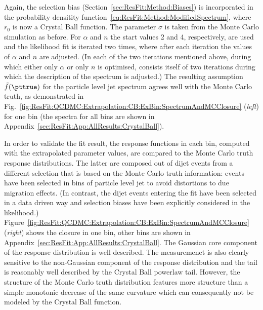 Again, the selection bias (Section~\ref{sec:ResFit:Method:Biases}) is incorporated in the probability densitity function~\eqref{eq:ResFit:Method:ModifiedSpectrum}, where $r_{0}$ is now a Crystal Ball function.
The parameter $\sigma$ is taken from the Monte Carlo simulation as before.
For $\alpha$ and $n$ the start values 2 and 4, respectively, are used and the likelihood fit is iterated two times, where after each iteration the values of $\alpha$ and $n$ are adjusted.
(In each of the two iterations mentioned above, during which either only $\alpha$ or only $n$ is optimised, consists itself of two iterations during which the description of the spectrum is adjusted.)
The resulting assumption~$\tilde{f}(\pttrue)$ for the particle level jet \pt spectrum agrees well with the Monte Carlo truth, as demonstrated in Fig.~\ref{fig:ResFit:QCDMC:Extrapolation:CB:ExBin:SpectrumAndMCClosure} (\textit{left}) for one \pt bin (the spectra for all \pt bins are shown in Appendix~\ref{sec:ResFit:App:AllResults:CrystalBall}).

In order to validate the fit result, the response functions in each \pt bin, computed with the extrapolated parameter values, are compared to the Monte Carlo truth response distributions.
The latter are composed out of dijet events from a different selection that is based on the Monte Carlo truth information: events have been selected in bins of particle level jet \pt to avoid distortions to due migration effects.
(In contrast, the dijet events entering the fit have been selected in a data driven way and selection biases have been explicitly considered in the likelihood.)
Figure~\ref{fig:ResFit:QCDMC:Extrapolation:CB:ExBin:SpectrumAndMCClosure} (\textit{right}) shows the closure in one \pt bin, other \pt bins are shown in Appendix~\ref{sec:ResFit:App:AllResults:CrystalBall}.
The Gaussian core component of the response distribution is well described.
The measuremenet is also clearly sensitive to the non-Gaussian component of the response distribution and the tail is reasonably well described by the Crystal Ball powerlaw tail.
However, the structure of the Monte Carlo truth distribution features more structure than a simple monotonic decrease of the same curvature which can consequently not be modeled by the Crystal Ball function.
